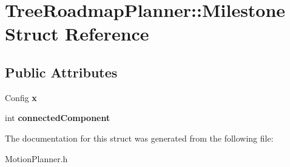 \section{Tree\+Roadmap\+Planner\+:\+:Milestone Struct Reference}
\label{structTreeRoadmapPlanner_1_1Milestone}
\subsection*{Public Attributes}
\begin{DoxyCompactItemize}
\item 
Config {\bfseries x}\label{structTreeRoadmapPlanner_1_1Milestone_ac46bf74c5f8ce2bbccb2d4a5b68b3020}

\item 
int {\bfseries connected\+Component}\label{structTreeRoadmapPlanner_1_1Milestone_a99a7d65ce11b012f4c21a8e584672dea}

\end{DoxyCompactItemize}


The documentation for this struct was generated from the following file\+:\begin{DoxyCompactItemize}
\item 
Motion\+Planner.\+h\end{DoxyCompactItemize}
